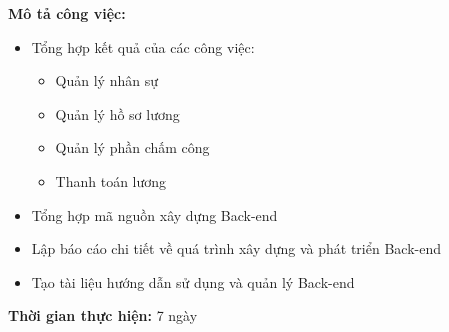 {\begin{minipage}{\textwidth}
\begin{itemize}
    \end{itemize}
    \noindent \textbf{Mô tả công việc:}
    \begin{itemize}
        \item Tổng hợp kết quả của các công việc:
        \begin{itemize}
            \item Quản lý nhân sự
            \item Quản lý hồ sơ lương
            \item Quản lý phần chấm công
            \item Thanh toán lương
        \end{itemize}
        \item Tổng hợp mã nguồn xây dựng Back-end
        \item Lập báo cáo chi tiết về quá trình xây dựng và phát triển Back-end
        \item Tạo tài liệu hướng dẫn sử dụng và quản lý Back-end
    \end{itemize}
    \noindent \textbf{Thời gian thực hiện:} 7 ngày \\
    \end{minipage}
}
\newpage
